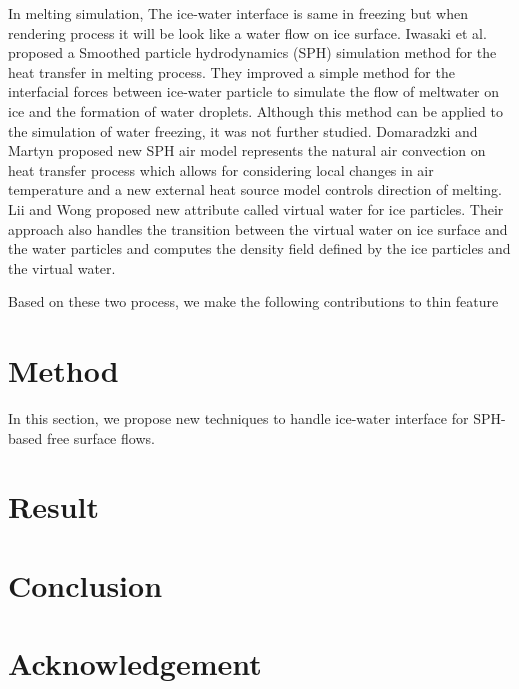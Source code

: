 \documentclass[10pt, twocolumn] {IEEEtran}
\begin{document}
 In melting simulation, The ice-water interface is same in freezing but when rendering process it will be look like a water flow on ice surface. Iwasaki et al.\cite{iwasaki2010fast} proposed a Smoothed particle hydrodynamics (SPH) simulation method for the heat transfer in melting process. They improved a simple method for the interfacial forces between ice-water particle to simulate the flow of meltwater on ice and the formation of water droplets. Although this method can be applied to the simulation of water freezing, it was not further studied.
 Domaradzki and Martyn\cite{domaradzki2014improved} proposed new SPH air model represents the natural air convection on heat transfer process  which allows for considering  local changes in air temperature and a new external heat source model controls direction of melting.
 Lii and Wong\cite{lii2014ice} proposed new attribute called virtual water for ice particles. Their approach also handles the transition between the virtual water on ice surface and the water particles and computes the density field defined by the ice particles and the virtual water.
 
 Based on these two process, we make the following contributions to thin feature

\section{Method}
In this section, we propose new techniques to handle ice-water interface for SPH-based free surface flows.
\section{Result}
\section{Conclusion}
\section{Acknowledgement}

\nocite{*}


\end{document}
